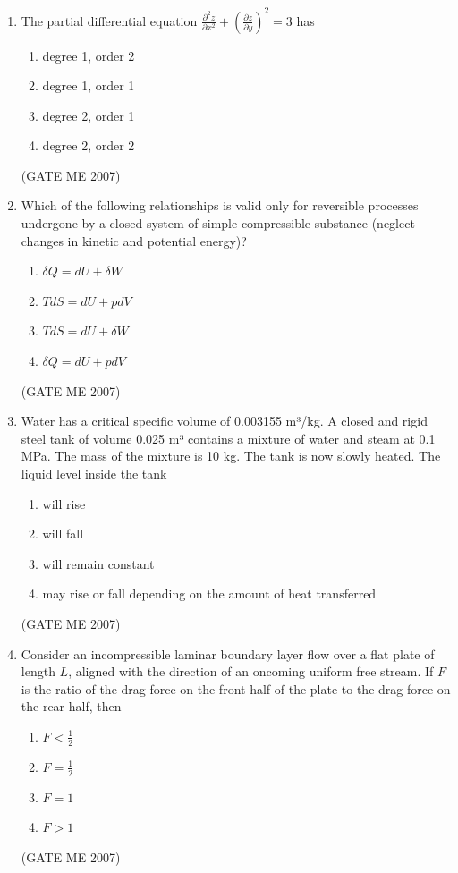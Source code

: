 \documentclass[journal]{IEEEtran}
\begin{document}
\begin{enumerate}
\item The partial differential equation \( \frac{\partial^2 z}{\partial x^2} + \left( \frac{\partial z}{\partial y} \right)^2 = 3 \) has
\begin{multicols}{2}
\begin{enumerate}
\item degree 1, order 2
\item degree 1, order 1
\item degree 2, order 1
\item degree 2, order 2
\end{enumerate}
\end{multicols}
\hfill (GATE ME 2007)

\item Which of the following relationships is valid only for reversible processes undergone by a closed system of simple compressible substance (neglect changes in kinetic and potential energy)?
\begin{multicols}{2}
\begin{enumerate}
\item \( \delta Q = dU + \delta W \)
\item \( T dS = dU + p dV \)
\item \( T dS = dU + \delta W \)
\item \( \delta Q = dU + p dV \)
\end{enumerate}
\end{multicols}
\hfill (GATE ME 2007)

\item Water has a critical specific volume of 0.003155 m³/kg. A closed and rigid steel tank of volume 0.025 m³ contains a mixture of water and steam at 0.1 MPa. The mass of the mixture is 10 kg. The tank is now slowly heated. The liquid level inside the tank
\begin{enumerate}
\item will rise
\item will fall
\item will remain constant
\item may rise or fall depending on the amount of heat transferred
\end{enumerate}
\hfill (GATE ME 2007)

\item Consider an incompressible laminar boundary layer flow over a flat plate of length \( L \), aligned with the direction of an oncoming uniform free stream. If \( F \) is the ratio of the drag force on the front half of the plate to the drag force on the rear half, then
\begin{multicols}{4}
\begin{enumerate}
\item \( F < \frac{1}{2} \)
\item \( F = \frac{1}{2} \)
\item \( F = 1 \)
\item \( F > 1 \)
\end{enumerate}
\end{multicols}
\hfill (GATE ME 2007)


\end{enumerate}
\end{document}
